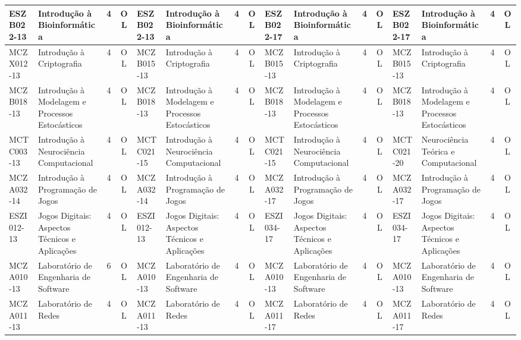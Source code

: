 \documentclass[a4paper]{article}
\begin{document}
\begin{landscape}
{\begin{longtable}{|l|p{.15\textheight}|c|c||l|p{.15\textheight}|c|c||l|p{.15\textheight}|c|c||l|p{.15\textheight}|c|c|}
    ESZB022-13 & Introdução à Bioinformática & 4 & OL &
    ESZB022-13 & Introdução à Bioinformática & 4 & OL &
    ESZB022-17 & Introdução à Bioinformática & 4 & OL & 
    ESZB022-17 & Introdução à Bioinformática & 4 & OL \\ \hline

    MCZX012-13 & Introdução à Criptografia & 4 & OL &
    MCZB015-13 & Introdução à Criptografia & 4 & OL &
    MCZB015-13 & Introdução à Criptografia & 4 & OL & 
    MCZB015-13 & Introdução à Criptografia & 4 & OL \\ \hline

    MCZB018-13 & Introdução à Modelagem e Processos Estocásticos & 4 & OL &
    MCZB018-13 & Introdução à Modelagem e Processos Estocásticos & 4 & OL &
    MCZB018-13 & Introdução à Modelagem e Processos Estocásticos & 4 & OL &
    MCZB018-13 & Introdução à Modelagem e Processos Estocásticos & 4 & OL \\ \hline

    MCTC003-13 & Introdução à Neurociência Computacional & 4 & OL &
    MCTC021-15 & Introdução à Neurociência Computacional & 4 & OL &
    MCTC021-15 & Introdução à Neurociência Computacional & 4 & OL & 
    MCTC021-20 & Neurociência Teórica e Computacional    & 4 & OL \\ \hline

    MCZA032-14 & Introdução à Programação de Jogos & 4 & OL &
    MCZA032-14 & Introdução à Programação de Jogos & 4 & OL &
    MCZA032-17 & Introdução à Programação de Jogos & 4 & OL &
    MCZA032-17 & Introdução à Programação de Jogos & 4 & OL \\ \hline

    ESZI012-13 & Jogos Digitais: Aspectos Técnicos e Aplicações & 4 & OL &
    ESZI012-13 & Jogos Digitais: Aspectos Técnicos e Aplicações & 4 & OL &
    ESZI034-17 & Jogos Digitais: Aspectos Técnicos e Aplicações & 4 & OL &
    ESZI034-17 & Jogos Digitais: Aspectos Técnicos e Aplicações & 4 & OL \\ \hline

    MCZA010-13 & Laboratório de Engenharia de Software & 6 & OL &
    MCZA010-13 & Laboratório de Engenharia de Software & 4 & OL &
    MCZA010-13 & Laboratório de Engenharia de Software & 4 & OL &
    MCZA010-13 & Laboratório de Engenharia de Software & 4 & OL \\ \hline

    MCZA011-13 & Laboratório de Redes & 4 & OL &
    MCZA011-13 & Laboratório de Redes & 4 & OL &
    MCZA011-17 & Laboratório de Redes & 4 & OL &
    MCZA011-17 & Laboratório de Redes & 4 & OL \\ \hline


\end{longtable}}
\end{landscape}
\end{document}
